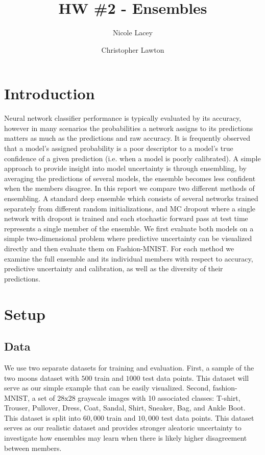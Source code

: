 \documentclass[10pt]{article}
\title{HW \#2 - Ensembles}
\author{Nicole Lacey \and Christopher Lawton}
\date{}
\begin{document}
\maketitle

\section{Introduction}
Neural network classifier performance is typically evaluated by its accuracy, however in many scenarios the probabilities a network assigns to its predictions matters as much as the predictions and raw accuracy.
It is frequently observed that a model's assigned probability is a poor descriptor to a model's true confidence of a given prediction (i.e. when a model is poorly calibrated).
A simple approach to provide insight into model uncertainty is through ensembling, by averaging the predictions of several models, the ensemble becomes less confident when the members disagree.
In this report we compare two different methods of ensembling.
A standard deep ensemble which consists of several networks trained separately from different random initializations, and MC dropout where a single network with dropout is trained and each stochastic forward pass at test time represents a single member of the ensemble.
We first evaluate both models on a simple two-dimensional problem where predictive uncertainty can be visualized directly and then evaluate them on Fashion-MNIST.
For each method we examine the full ensemble and its individual members with respect to accuracy, predictive uncertainty and calibration, as well as the diversity of their predictions.

\section{Setup}

\subsection{Data}

We use two separate datasets for training and evaluation.
First, a sample of the two moons dataset with $500$ train and $1000$ test data points.
This dataset will serve as our simple example that can be easily visualized.
Second, fashion-MNIST, a set of $28\text{x}28$ grayscale images with 10 associated classes: T-shirt, Trouser, Pullover, Dress, Coat, Sandal, Shirt, Sneaker, Bag, and Ankle Boot.
This dataset is split into $60,000$ train and $10,000$ test data points.
This dataset serves as our realistic dataset and provides stronger aleatoric uncertainty to investigate how ensembles may learn when there is likely higher disagreement between members.
\end{document}

